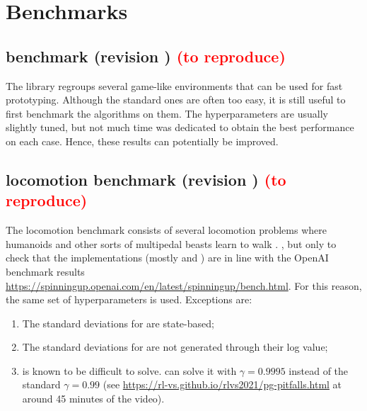 \chapter{Benchmarks}

\section{\gym benchmark (revision ) \textcolor{red}{(to reproduce)}}

The \gym library regroups several game-like environments that can be used for fast prototyping. Although the standard ones are often too easy, it is still useful to first benchmark the algorithms on them. The hyperparameters are usually slightly tuned, but not much time was dedicated to obtain the best performance on each case. Hence, these results can potentially be improved.



\section{\mujoco locomotion benchmark (revision ) \textcolor{red}{(to reproduce)}}

The \mujoco locomotion benchmark consists of several locomotion problems where humanoids and other sorts of multipedal beasts learn to walk \cite{mujoco}. , but only to check that the implementations (mostly \tdt and \sac) are in line with the OpenAI benchmark results \url{https://spinningup.openai.com/en/latest/spinningup/bench.html}. For this reason, the same set of hyperparameters is used. Exceptions are:

\begin{enumerate}
	\item The standard deviations for \ppo are state-based;
	\item The standard deviations for \sac are not generated through their log value;
	\item {} is known to be difficult to solve. \ppo can solve it with $\gamma = 0.9995$ instead of the standard $\gamma = 0.99$ (see \url{https://rl-vs.github.io/rlvs2021/pg-pitfalls.html} at around 45 minutes of the video).
\end{enumerate}

